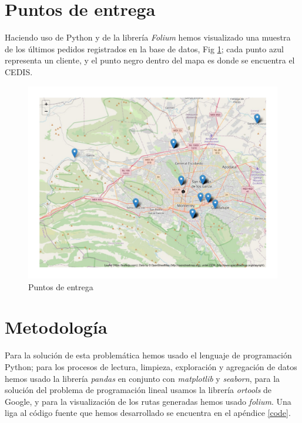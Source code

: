 \documentclass[journal]{IEEEtran}
\begin{document}
    \section{Puntos de entrega}
        
        Haciendo uso de Python y de la librería \emph{Folium} hemos visualizado una muestra de los últimos pedidos registrados en la base de datos, Fig \ref{puntos-entrega-mapa}; cada punto azul representa un cliente, y el punto negro dentro del mapa es donde se encuentra el CEDIS.
        
        \begin{figure}[!ht]
            \centering
            \includegraphics[scale=0.3]{img/deliveries-plot.pdf}
            \caption{Puntos de entrega} 
            \label{puntos-entrega-mapa}
        \end{figure}
    
    \section{Metodología}
    
        Para la solución de esta problemática hemos usado el lenguaje de programación Python; para los procesos de lectura, limpieza, exploración y agregación de datos hemos usado la librería \emph{pandas} en conjunto con \emph{matplotlib} y \emph{seaborn}, para la solución del problema de programación lineal usamos la librería \emph{ortools} de Google, y para la visualización de los rutas generadas hemos usado \emph{folium}. Una liga al código fuente que hemos desarrollado se encuentra en el apéndice \ref{code}.
        
\end{document}

